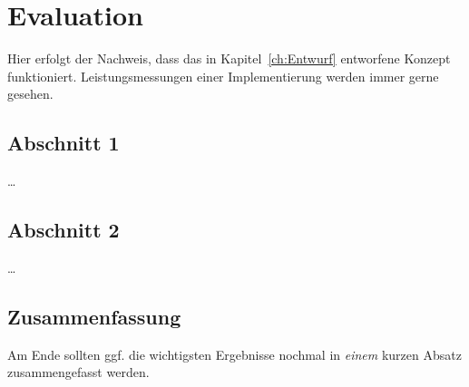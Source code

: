 
\chapter{Evaluation}
\label{ch:Evaluierung}
Hier erfolgt der Nachweis, dass das in Kapitel~\ref{ch:Entwurf}
entworfene Konzept funktioniert. 
Leistungsmessungen einer Implementierung werden immer gerne gesehen.

\section{Abschnitt 1}
\label{ch:Evaluierung:sec:Abschnitt1}

\ldots

\section{Abschnitt 2}
\label{ch:Evaluierung:sec:Abschnitt2}

\ldots

\section{Zusammenfassung}
\label{ch:Evaluierung:sec:zusammenfassung}

Am Ende sollten ggf. die wichtigsten Ergebnisse nochmal in \emph{einem} kurzen Absatz zusammengefasst werden.

